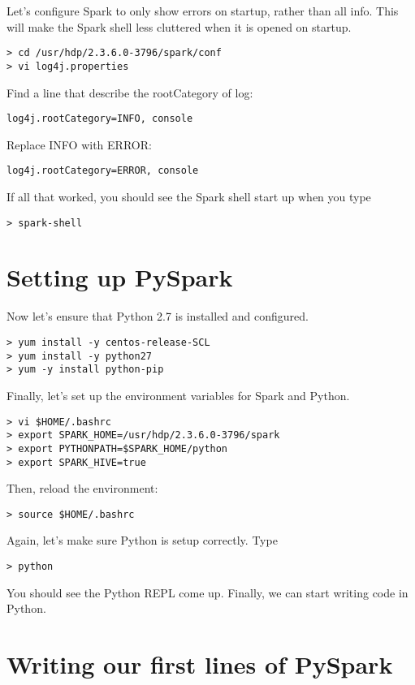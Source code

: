 \documentclass[9pt,twocolumn,twoside]{idsi}
\begin{document}
\noindent
Let's configure Spark to only show errors on startup, rather than all info. This will make the Spark shell less cluttered when it is opened on startup.
\begin{verbatim}
> cd /usr/hdp/2.3.6.0-3796/spark/conf
> vi log4j.properties
\end{verbatim}

\noindent
Find a line that describe the rootCategory of log:
\begin{verbatim}
log4j.rootCategory=INFO, console
\end{verbatim}

Replace INFO with ERROR:
\begin{verbatim}
log4j.rootCategory=ERROR, console
\end{verbatim}

If all that worked, you should see the Spark shell start up when you type
\begin{verbatim}
> spark-shell
\end{verbatim}

\section{Setting up PySpark}

Now let's ensure that Python 2.7 is installed and configured.
\begin{verbatim}
> yum install -y centos-release-SCL
> yum install -y python27
> yum -y install python-pip
\end{verbatim}

\noindent
Finally, let's set up the environment variables for Spark and Python.
\begin{verbatim}
> vi $HOME/.bashrc
> export SPARK_HOME=/usr/hdp/2.3.6.0-3796/spark
> export PYTHONPATH=$SPARK_HOME/python
> export SPARK_HIVE=true
\end{verbatim}

\noindent
Then, reload the environment:
\begin{verbatim}
> source $HOME/.bashrc
\end{verbatim}

Again, let's make sure Python is setup correctly. Type
\begin{verbatim}
> python
\end{verbatim}
You should see the Python REPL come up. Finally, we can start writing code in Python.

\section{Writing our first lines of PySpark}
\end{document}
